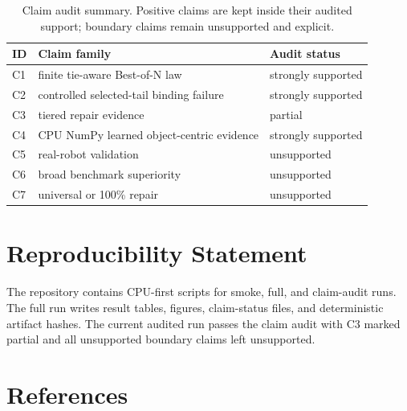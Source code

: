 \documentclass[10pt]{article}
\begin{document}
\begin{table}[t]
  \centering
  \caption{Claim audit summary. Positive claims are kept inside their audited support; boundary claims remain unsupported and explicit.}
  \label{tab:claims}
  \begin{tabular}{lll}
    \toprule
    ID & Claim family & Audit status \\
    \midrule
    C1 & finite tie-aware Best-of-N law & strongly supported \\
    C2 & controlled selected-tail binding failure & strongly supported \\
    C3 & tiered repair evidence & partial \\
    C4 & CPU NumPy learned object-centric evidence & strongly supported \\
    C5 & real-robot validation & unsupported \\
    C6 & broad benchmark superiority & unsupported \\
    C7 & universal or 100\% repair & unsupported \\
    \bottomrule
  \end{tabular}
\end{table}

\section*{Reproducibility Statement}

The repository contains CPU-first scripts for smoke, full, and claim-audit runs. The full run writes result tables, figures, claim-status files, and deterministic artifact hashes. The current audited run passes the claim audit with C3 marked partial and all unsupported boundary claims left unsupported.

\section*{References}
\end{document}
